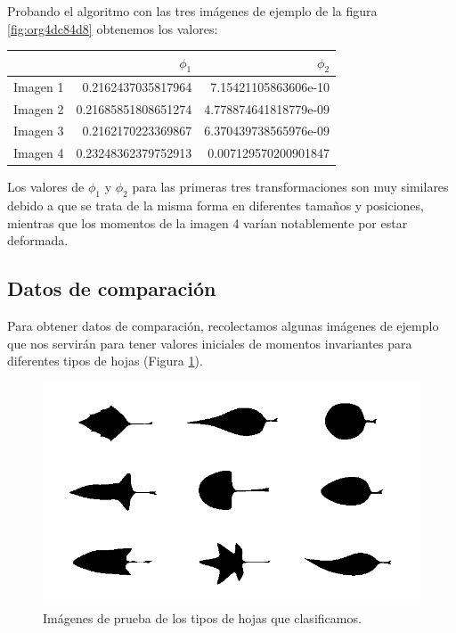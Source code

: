 \documentclass[letter]{article}
\begin{document}
Probando el algoritmo con las tres imágenes de ejemplo de la figura \ref{fig:org4dc84d8} obtenemos
los valores:

\begin{center}
\begin{tabular}{lrr}
 & \(\phi_1\) & \(\phi_2\)\\
\hline
Imagen 1 & 0.2162437035817964 & 7.15421105863606e-10\\
Imagen 2 & 0.21685851808651274 & 4.778874641818779e-09\\
Imagen 3 & 0.2162170223369867 & 6.370439738565976e-09\\
Imagen 4 & 0.23248362379752913 & 0.007129570200901847\\
\end{tabular}
\end{center}

Los valores de \(\phi_1\) y \(\phi_2\) para las primeras tres transformaciones son
muy similares debido a que se trata de la misma forma en diferentes tamaños y
posiciones, mientras que los momentos de la imagen 4 varían notablemente por
estar deformada.

\subsection{Datos de comparación}
\label{sec:orgc48f752}
Para obtener datos de comparación, recolectamos algunas imágenes de ejemplo que
nos servirán para tener valores iniciales de momentos invariantes para
diferentes tipos de hojas (Figura \ref{fig:orgea7d1d2}).

\begin{figure}[htbp]
\centering
\includegraphics[width=.9\linewidth]{./images/leaves.png}
\caption{\label{fig:orgea7d1d2}Imágenes de prueba de los tipos de hojas que clasificamos.}
\end{figure}
\end{document}
